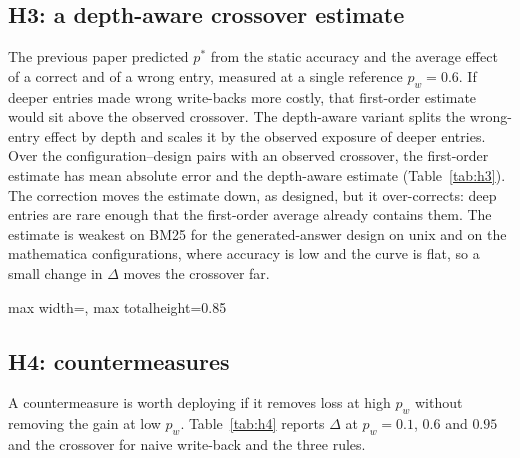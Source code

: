 \documentclass[11pt]{article}
\begin{document}
\subsection{H3: a depth-aware crossover estimate}
The previous paper predicted $p^*$ from the static accuracy and the average effect of a correct and of a wrong entry, measured at a single reference $p_w=0.6$. If deeper entries made wrong write-backs more costly, that first-order estimate would sit above the observed crossover. The depth-aware variant splits the wrong-entry effect by depth and scales it by the observed exposure of deeper entries. Over the \nPlugCfg{} configuration--design pairs with an observed crossover, the first-order estimate has mean absolute error \maePlugOne{} and the depth-aware estimate \maePlugTwo{} (Table~\ref{tab:h3}). The correction moves the estimate down, as designed, but it over-corrects: deep entries are rare enough that the first-order average already contains them. The estimate is weakest on BM25 for the generated-answer design on unix and on the mathematica configurations, where accuracy is low and the curve is flat, so a small change in $\Delta$ moves the crossover far.

\begin{table}[t]\centering\small
\caption{H3. Observed crossover against the first-order plug-in estimate of \citet{guthikonda2026accepted} and the depth-aware estimate, both measured at $p_w=0.6$.}\label{tab:h3}
\begin{adjustbox}{max width=\linewidth, max totalheight=0.85\textheight}\end{adjustbox}
\end{table}

\subsection{H4: countermeasures}
A countermeasure is worth deploying if it removes loss at high $p_w$ without removing the gain at low $p_w$. Table~\ref{tab:h4} reports $\Delta$ at $p_w=0.1$, $0.6$ and $0.95$ and the crossover for naive write-back and the three rules.
\end{document}
